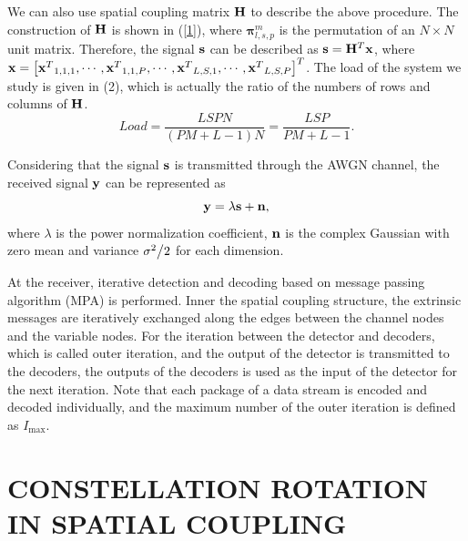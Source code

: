 \documentclass[conference]{IEEEtran}
\begin{document}
We can also use spatial coupling matrix $\bf{H}$ to describe the above procedure. The construction of $\bf{H}$ is shown in (\ref{1}), where ${\bm{\pi }}_{l,s,p}^m$ is the permutation of an $N  \times N $ unit matrix. Therefore, the signal $\bf{s}$ can be described as ${\bf{s}} = {{\bf{H}}^T}{\bf{x}}$, where ${\bf{x}} = {\left[ {{{\bf{x}}^T}_{1,1,1}, \cdots ,{{\bf{x}}^T}_{1,1,P}, \cdots ,{{\bf{x}}^T}_{L,S,1}, \cdots ,{{\bf{x}}^T}_{L,S,P}} \right]^T}$.
The load of the system we study is given in (2), which is actually the ratio of the numbers of rows and columns of ${\bf{H}}$.
\begin{equation}
Load = \frac{{LSPN}}{{(PM + L - 1)N}} = \frac{{LSP}}{{PM + L - 1}}\label{2}.
\end{equation}

Considering that the signal ${\bf{s}}$ is transmitted through the AWGN channel, the received signal ${\bf{y}}$ can be represented as
\begin{equation}
{\bf{y}} = \lambda {\bf{s}} + {\bf{n}}\label{3},
\end{equation}
where $\lambda $ is the power normalization coefficient, ${\bf{n}}$ is the complex Gaussian with zero mean and variance ${{{\sigma ^2}} \mathord{\left/
 {\vphantom {{{\sigma ^2}} 2}} \right.
 \kern-\nulldelimiterspace} 2}$ for each dimension.

At the receiver, iterative detection and decoding based on message passing algorithm (MPA) is performed. Inner the spatial coupling structure, the extrinsic messages are iteratively exchanged along the edges between the channel nodes and the variable nodes. For the iteration between the detector and decoders, which is called outer iteration, and the output of the detector is transmitted to the decoders, the outputs of the decoders is used as the input of the detector for the next iteration. Note that each package of a data stream is encoded and decoded individually, and the maximum number of the outer iteration is defined as ${I_{\max }}$.
\section{CONSTELLATION ROTATION IN SPATIAL COUPLING}
\end{document}
